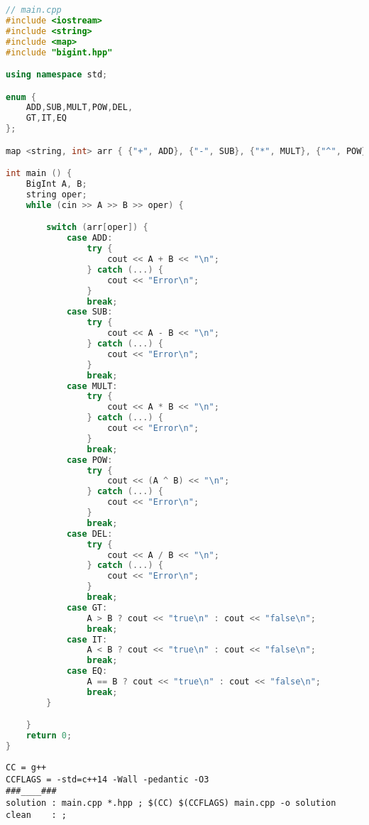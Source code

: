 \begin{lstlisting}[language=C++]
// main.cpp
#include <iostream>
#include <string>
#include <map>
#include "bigint.hpp"

using namespace std;

enum {
    ADD,SUB,MULT,POW,DEL,
    GT,IT,EQ
};

map <string, int> arr { {"+", ADD}, {"-", SUB}, {"*", MULT}, {"^", POW}, {"/", DEL}, {">", GT}, {"<", IT}, {"=", EQ} };

int main () {
    BigInt A, B;
    string oper;
    while (cin >> A >> B >> oper) {

        switch (arr[oper]) {
            case ADD:
                try {
                    cout << A + B << "\n";
                } catch (...) {
                    cout << "Error\n";
                }
                break;
            case SUB:
                try {
                    cout << A - B << "\n";
                } catch (...) {
                    cout << "Error\n";
                }
                break;
            case MULT:
                try {
                    cout << A * B << "\n";
                } catch (...) {
                    cout << "Error\n";
                }
                break;
            case POW:
                try {
                    cout << (A ^ B) << "\n";
                } catch (...) {
                    cout << "Error\n";
                }
                break;
            case DEL:
                try {
                    cout << A / B << "\n";
                } catch (...) {
                    cout << "Error\n";
                }
                break;
            case GT:
                A > B ? cout << "true\n" : cout << "false\n";
                break;
            case IT:
                A < B ? cout << "true\n" : cout << "false\n";
                break;
            case EQ:
                A == B ? cout << "true\n" : cout << "false\n";
                break;
        }

    }
    return 0;
}
\end{lstlisting}

\lstset{language=[gnu] make}

\begin{lstlisting}
CC = g++
CCFLAGS = -std=c++14 -Wall -pedantic -O3
###____###
solution : main.cpp *.hpp ; $(CC) $(CCFLAGS) main.cpp -o solution
clean	 : ;
\end{lstlisting}

